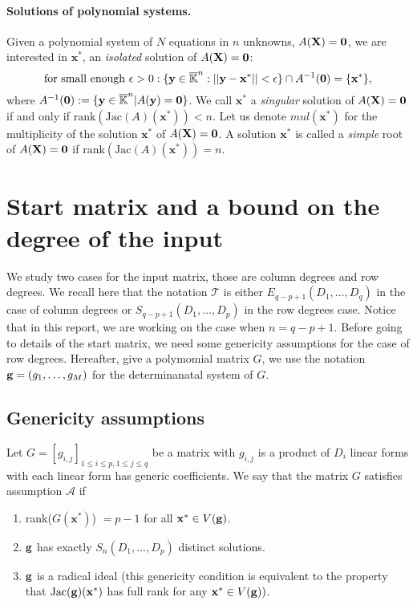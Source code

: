 \documentclass[11pt]{article}
\numberwithin{Property}{section}
\numberwithin{Theorem}{section}
\numberwithin{Proposition}{section}
\numberwithin{Lemma}{section}
\numberwithin{Corollary}{section}
\numberwithin{Definition}{section}
\numberwithin{Remark}{section}
\numberwithin{Conjecture}{section}
\numberwithin{Problem}{section}
\numberwithin{Claim}{section}
\theoremstyle{definition}
\numberwithin{Example}{section}
\renewcommand{\leq}{\leqslant}
\def\bar{\overline}
\newcommand{\field}{\mathbb{K}} %
\newcommand{\mat}[1]{\mathbf{\MakeUppercase{#1}}} %
\begin{document}
\paragraph{Solutions of polynomial systems.} Given a polynomial system of $N$ equations in $n$ unknowns, $A(\mat{X}) = \mat{0}$, we are interested in $\mathbf{x}^*$, an \emph{isolated} solution of $A(\mat{X}) = \mat{0}$:
\[
\mathrm{for \ small \ enough} \ \epsilon > 0 : \{\mathbf{y} \in \bar{\field}^n : ||\mathbf{y} - \mathbf{x}^*|| < \epsilon\} \cap A^{-1}(\mat{0}) = \{\mathbf{x}^*\}, 
\] where $A^{-1}(\mat{0}) := \{\mathbf{y} \in \bar{\field}^n | A(\mathbf{y}) = \mat{0}\}$. We call $\mathbf{x}^*$ a \emph{singular} solution of $A(\mat{X}) = \mat{0}$ if and only if $\mathrm{rank}(\mathrm{Jac}(A)(\mathbf{x}^*)) < n$.  Let us denote $mul(\mathbf{x}^*)$ for the multiplicity of the solution $\mathbf{x}^*$ of $A(\mat{X}) = \mat{0}$.   A solution $\mathbf{x}^*$ is called a \emph{simple} root of $A(\mat{X}) = \mat{0}$ if  $\mathrm{rank}(\mathrm{Jac}(A)(\mathbf{x}^*)) = n$.

\section{Start matrix and a bound on the degree of the input}
\label{sec:startbound}
We study two cases for the input matrix, those are column degrees and row degrees. We recall here that the notation $\mathcal{T}$ is either $E_{q-p+1}(D_1, \ldots, D_q)$ in the case of column degrees or $S_{q-p+1}(D_1, \ldots, D_p)$ in the row degrees case. Notice that in this report, we are working on the case when $n = q-p+1$. Before going to details of the start matrix, we need some genericity assumptions for the case of row degrees. Hereafter, give a polymomial matrix $G$, we use the notation ${\bf g} = (g_1, \ldots, g_M)$ for the determinanatal system of $G$. 
\subsection{Genericity assumptions}
\label{subsec:genericity}
Let $G = [g_{i,j}]_{1 \leq i \leq p, 1 \leq j \leq q}$ be a matrix with $g_{i,j}$ is a product of $D_i$ linear forms with each linear form has generic coefficients. We say that the matrix $G$ satisfies assumption $\mathcal{A}$ if 
\begin{enumerate}
\item rank($G(\mathbf{x}^*)$) $= p-1$ for all $\mathbf{x}^* \in V({\bf g})$.
\item ${\bf g}$ has exactly $S_{n}(D_1, \ldots, D_p)$ distinct solutions.  
\item ${\bf g}$ is a radical ideal (this genericity condition is equivalent to the property that $\mathrm{Jac}({\bf g})(\mathbf{x}^*)$ has full rank for any $\mathbf{x}^* \in V({\bf g}))$. 
\end{enumerate}
\end{document}
